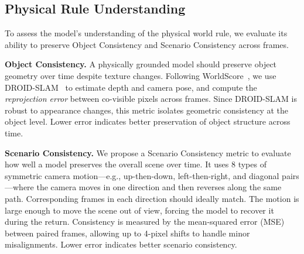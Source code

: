\documentclass{article}
\begin{document}
\subsection{Physical Rule Understanding}
To assess the model’s understanding of the physical world rule, we evaluate its ability to preserve {Object Consistency} and Scenario Consistency across frames. 

 
\noindent\textbf{{Object Consistency.}} A physically grounded model should preserve object geometry over time despite texture changes. Following WorldScore~\cite{duan2025worldscore}, we use DROID-SLAM~\cite{teed2021droid} to estimate depth and camera pose, and compute the \textit{reprojection error} between co-visible pixels across frames. Since DROID-SLAM is robust to appearance changes, this metric isolates geometric consistency at the object level. Lower error indicates better preservation of object structure across time. 

 

\textbf{Scenario Consistency.}
We propose a Scenario Consistency metric to evaluate how well a model preserves the overall scene over time. It uses 8 types of symmetric camera motion—e.g., up-then-down, left-then-right, and diagonal pairs—where the camera moves in one direction and then reverses along the same path. Corresponding frames in each direction should ideally match. The motion is large enough to move the scene out of view, forcing the model to recover it during the return. Consistency is measured by the mean-squared error (MSE) between paired frames, allowing up to 4-pixel shifts to handle minor misalignments. Lower error indicates better scenario consistency.
\end{document}
